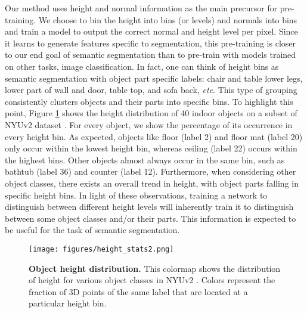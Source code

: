 Our method uses height and normal information as the main precursor for pre-training. We choose to bin the height into  bins (or levels) and normals into  bins and train a model to output the correct normal and height level per pixel. Since it learns to generate features specific to segmentation, this pre-training is closer to our end goal of semantic segmentation than to pre-train with models trained on other tasks, \eg image classification. In fact, one can think of height bins as semantic segmentation with object part specific labels: chair and table lower legs, lower part of wall and door, table top, and sofa back, \textit{etc}. This type of grouping consistently clusters objects and their parts into specific bins. To highlight this point, Figure \ref{fig:height_stats} shows the height distribution of 40 indoor objects on a subset of NYUv2 dataset \cite{Silberman2012}. For every object, we show the percentage of its occurrence in every height bin. As expected, objects like floor (label 2) and floor mat (label 20) only occur within the lowest height bin, whereas ceiling (label 22) occurs within the highest bins. Other objects almost always occur in the same bin, such as bathtub (label 36) and counter (label 12). Furthermore, when considering other object classes, there exists an overall trend in height, with object parts falling in specific height bins. In light of these observations, training a network to distinguish between different height levels will inherently train it to distinguish between some object classes and/or their parts. This information is expected to be useful for the task of semantic segmentation.



\begin{figure}[!h]
\begin{center}
\texttt{[image: figures/height\_stats2.png]}
\end{center}
\vspace{-5pt}
   \caption{\textbf{Object height distribution.} This colormap shows the distribution of height for various object classes in NYUv2 \cite{Silberman2012}. Colors represent the fraction of 3D points of the same label that are located at a particular height bin.} 
\label{fig:height_stats}
\end{figure}


